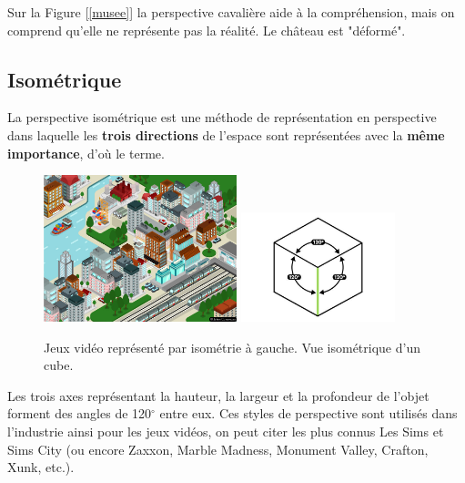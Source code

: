 \documentclass[
	11pt, %
	fleqn, %
	a4paper, %
]{LegrandOrangeBook}
\begin{document}
Sur la Figure [\ref{musee}] la perspective cavalière aide à la compréhension, mais on comprend qu'elle ne représente pas la réalité. Le château est "déformé".

\subsection{Isométrique}
La perspective isométrique est une méthode de représentation en perspective dans laquelle les \textbf{trois directions} de l'espace sont représentées avec la \textbf{même importance}, d'où le terme.


\begin{figure}[H] %
	\centering %
	\includegraphics[width=0.5\textwidth]{Images/iso.jpg} 
    \includegraphics[width=0.4\textwidth]{Images/iso2.jpg} 
	\caption{Jeux vidéo représenté par isométrie à gauche. Vue isométrique d'un cube.}
	\label{iso} %
\end{figure}

Les trois axes représentant la hauteur, la largeur et la profondeur de l’objet forment des angles de 120$^{\circ}$ entre eux. Ces styles de perspective sont utilisés dans l'industrie ainsi pour les jeux vidéos, on peut citer les plus connus Les Sims et Sims City (ou encore Zaxxon, Marble Madness, Monument Valley, Crafton, Xunk, etc.).

\end{document}
